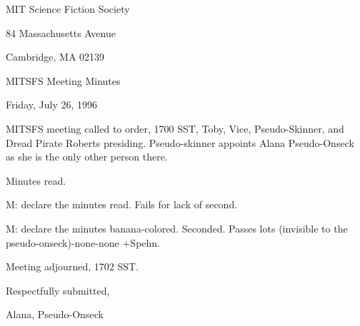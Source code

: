 \documentclass[12pt]{article}
\begin{document}
\begin{center}

MIT Science Fiction Society 

84 Massachusetts Avenue

Cambridge, MA 02139

\vspace{12pt}

MITSFS Meeting Minutes 

Friday, July 26, 1996

\end{center}
 
\vspace{18pt}

\setlength{\parskip}{6pt}

\noindent
MITSFS meeting called to order, 1700 SST,
Toby, Vice, Pseudo-Skinner, and Dread Pirate Roberts presiding. Pseudo-skinner appoints Alana Pseudo-Onseck as she is the only other person there.

Minutes read.

M: declare the minutes read. Fails for lack of second.

M: declare the minutes banana-colored. Seconded. Passes lots (invisible to the pseudo-onseck)-none-none +Spehn.

\vspace{12pt}

\noindent
Meeting adjourned, 1702 SST.

\vspace{18pt}

\centerline{Respectfully submitted,}
\centerline{Alana, Pseudo-Onseck}
\end{document}
